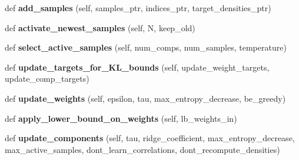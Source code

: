 \begin{DoxyCompactItemize}
\item 
def {\bfseries add\+\_\+samples} (self, samples\+\_\+ptr, indices\+\_\+ptr, target\+\_\+densities\+\_\+ptr)\hypertarget{classVIPS__PythonWrapper_1_1VIPS__PythonWrapper_a23823478d0783aa449e3cd1d0df226ae}{}\label{classVIPS__PythonWrapper_1_1VIPS__PythonWrapper_a23823478d0783aa449e3cd1d0df226ae}

\item 
def {\bfseries activate\+\_\+newest\+\_\+samples} (self, N, keep\+\_\+old)\hypertarget{classVIPS__PythonWrapper_1_1VIPS__PythonWrapper_a3f34753c13c3c84c64f59d10692ef6e1}{}\label{classVIPS__PythonWrapper_1_1VIPS__PythonWrapper_a3f34753c13c3c84c64f59d10692ef6e1}

\item 
def {\bfseries select\+\_\+active\+\_\+samples} (self, num\+\_\+comps, num\+\_\+samples, temperature)\hypertarget{classVIPS__PythonWrapper_1_1VIPS__PythonWrapper_ab12230147a31f6aad9030e2665a326ff}{}\label{classVIPS__PythonWrapper_1_1VIPS__PythonWrapper_ab12230147a31f6aad9030e2665a326ff}

\item 
def {\bfseries update\+\_\+targets\+\_\+for\+\_\+\+K\+L\+\_\+bounds} (self, update\+\_\+weight\+\_\+targets, update\+\_\+comp\+\_\+targets)\hypertarget{classVIPS__PythonWrapper_1_1VIPS__PythonWrapper_a655ac6d10787d77209af115b7f9974aa}{}\label{classVIPS__PythonWrapper_1_1VIPS__PythonWrapper_a655ac6d10787d77209af115b7f9974aa}

\item 
def {\bfseries update\+\_\+weights} (self, epsilon, tau, max\+\_\+entropy\+\_\+decrease, be\+\_\+greedy)\hypertarget{classVIPS__PythonWrapper_1_1VIPS__PythonWrapper_ae72f3ce8e5ffc43599b925657644f3be}{}\label{classVIPS__PythonWrapper_1_1VIPS__PythonWrapper_ae72f3ce8e5ffc43599b925657644f3be}

\item 
def {\bfseries apply\+\_\+lower\+\_\+bound\+\_\+on\+\_\+weights} (self, lb\+\_\+weights\+\_\+in)\hypertarget{classVIPS__PythonWrapper_1_1VIPS__PythonWrapper_a1c414ea0d6e4e499e1dec190a75e37c5}{}\label{classVIPS__PythonWrapper_1_1VIPS__PythonWrapper_a1c414ea0d6e4e499e1dec190a75e37c5}

\item 
def {\bfseries update\+\_\+components} (self, tau, ridge\+\_\+coefficient, max\+\_\+entropy\+\_\+decrease, max\+\_\+active\+\_\+samples, dont\+\_\+learn\+\_\+correlations, dont\+\_\+recompute\+\_\+densities)\hypertarget{classVIPS__PythonWrapper_1_1VIPS__PythonWrapper_ad57ed1641ce5d862fc75787f27d98c6a}{}\label{classVIPS__PythonWrapper_1_1VIPS__PythonWrapper_ad57ed1641ce5d862fc75787f27d98c6a}


\end{DoxyCompactItemize}
